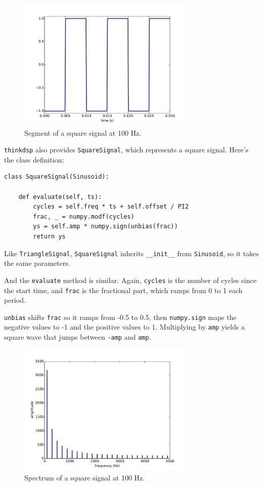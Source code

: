 \documentclass[12pt]{book}
\begin{document}
\begin{figure}
\centerline{\includegraphics[height=2.5in]{figs/square-100-1.pdf}}
\caption{Segment of a square signal at 100 Hz.}
\label{fig.square.100.1}
\end{figure}

{\tt thinkdsp} also provides {\tt SquareSignal}, which represents
a square signal.  Here's the class definition:

\begin{verbatim}
class SquareSignal(Sinusoid):
    
    def evaluate(self, ts):
        cycles = self.freq * ts + self.offset / PI2
        frac, _ = numpy.modf(cycles)
        ys = self.amp * numpy.sign(unbias(frac))
        return ys
\end{verbatim}

Like {\tt TriangleSignal}, {\tt SquareSignal} inherits 
\verb"__init__" from {\tt Sinusoid}, so it takes the same
parameters.

And the {\tt evaluate} method is similar.  Again, {\tt cycles} is
the number of cycles since the start time, and {\tt frac} is the
fractional part, which ramps from 0 to 1 each period.

{\tt unbias} shifts {\tt frac} so it ramps from -0.5 to 0.5,
then {\tt numpy.sign} maps the negative values to -1 and the
positive values to 1.  Multiplying by {\tt amp} yields a square
wave that jumps between {\tt -amp} and {\tt amp}.

\begin{figure}
\centerline{\includegraphics[height=2.5in]{figs/square-100-2.pdf}}
\caption{Spectrum of a square signal at 100 Hz.}
\label{fig.square.100.2}
\end{figure}
\end{document}
